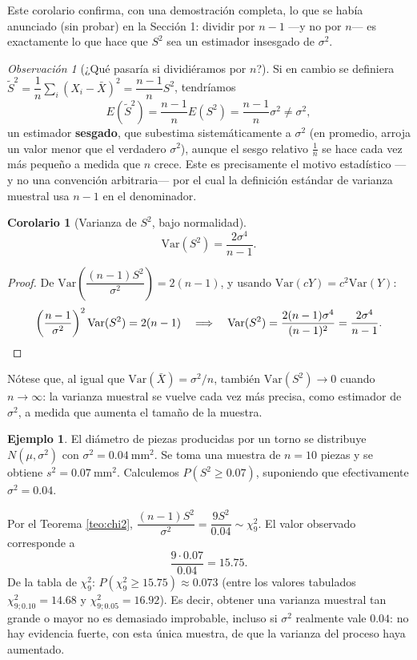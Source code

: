 \documentclass[11pt,a4paper]{article}
\theoremstyle{plain}
\newtheorem{corolario}[teorema]{Corolario}
\theoremstyle{definition}
\newtheorem{ejemplo}[teorema]{Ejemplo}
\theoremstyle{remark}
\newtheorem{observacion}[teorema]{Observación}
\begin{document}
Este corolario confirma, con una demostración completa, lo que se había anunciado (sin probar) en la Sección 1: dividir por $n-1$ —y no por $n$— es exactamente lo que hace que $S^2$ sea un estimador insesgado de $\sigma^2$.

\begin{observacion}[¿Qué pasaría si dividiéramos por $n$?]
Si en cambio se definiera $\tilde S^2 = \dfrac{1}{n}\sum_i (X_i-\bar X)^2 = \dfrac{n-1}{n}S^2$, tendríamos
$$E(\tilde S^2) = \frac{n-1}{n}E(S^2) = \frac{n-1}{n}\sigma^2 \neq \sigma^2,$$
un estimador \textbf{sesgado}, que subestima sistemáticamente a $\sigma^2$ (en promedio, arroja un valor menor que el verdadero $\sigma^2$), aunque el sesgo relativo $\frac{1}{n}$ se hace cada vez más pequeño a medida que $n$ crece. Este es precisamente el motivo estadístico —y no una convención arbitraria— por el cual la definición estándar de varianza muestral usa $n-1$ en el denominador.
\end{observacion}

\begin{corolario}[Varianza de $S^2$, bajo normalidad]
$$\mathrm{Var}(S^2) = \frac{2\sigma^4}{n-1}.$$
\end{corolario}

\begin{proof}
De $\mathrm{Var}\left(\dfrac{(n-1)S^2}{\sigma^2}\right)=2(n-1)$, y usando $\mathrm{Var}(cY)=c^2\mathrm{Var}(Y)$:
$$\left(\frac{n-1}{\sigma^2}\right)^2 \mathrm{Var}(S^2) = 2(n-1) \quad\Longrightarrow\quad \mathrm{Var}(S^2) = \frac{2(n-1)\sigma^4}{(n-1)^2} = \frac{2\sigma^4}{n-1}. \qedhere$$
\end{proof}

Nótese que, al igual que $\mathrm{Var}(\bar X)=\sigma^2/n$, también $\mathrm{Var}(S^2)\to 0$ cuando $n\to\infty$: la varianza muestral se vuelve cada vez más precisa, como estimador de $\sigma^2$, a medida que aumenta el tamaño de la muestra.

\begin{ejemplo}
El diámetro de piezas producidas por un torno se distribuye $N(\mu,\sigma^2)$ con $\sigma^2=0.04\ \text{mm}^2$. Se toma una muestra de $n=10$ piezas y se obtiene $s^2=0.07\ \text{mm}^2$. Calculemos $P(S^2\geq 0.07)$, suponiendo que efectivamente $\sigma^2=0.04$.

Por el Teorema \ref{teo:chi2}, $\dfrac{(n-1)S^2}{\sigma^2}=\dfrac{9S^2}{0.04}\sim \chi^2_9$. El valor observado corresponde a
$$\frac{9\cdot 0.07}{0.04} = 15.75.$$
De la tabla de $\chi^2_9$: $P(\chi^2_9\geq 15.75)\approx 0.073$ (entre los valores tabulados $\chi^2_{9;0.10}=14.68$ y $\chi^2_{9;0.05}=16.92$). Es decir, obtener una varianza muestral tan grande o mayor no es demasiado improbable, incluso si $\sigma^2$ realmente vale $0.04$: no hay evidencia fuerte, con esta única muestra, de que la varianza del proceso haya aumentado.
\end{ejemplo}
\end{document}
